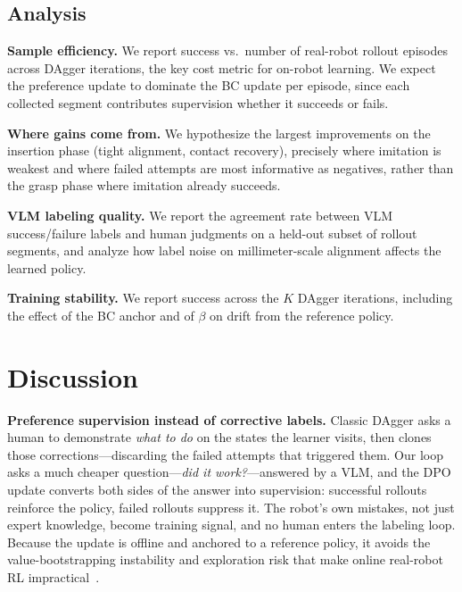 \documentclass[letterpaper, 10pt, conference]{ieeeconf}
\begin{document}
\subsection{Analysis}
\label{subsec:analysis}

\textbf{Sample efficiency.} We report success vs.\ number of real-robot rollout episodes across DAgger iterations, the key cost metric for on-robot learning. We expect the preference update to dominate the BC update per episode, since each collected segment contributes supervision whether it succeeds or fails.

\textbf{Where gains come from.} We hypothesize the largest improvements on the insertion phase (tight alignment, contact recovery), precisely where imitation is weakest and where failed attempts are most informative as negatives, rather than the grasp phase where imitation already succeeds.

\textbf{VLM labeling quality.} We report the agreement rate between VLM success/failure labels and human judgments on a held-out subset of rollout segments, and analyze how label noise on millimeter-scale alignment affects the learned policy.

\textbf{Training stability.} We report success across the $K$ DAgger iterations, including the effect of the BC anchor and of $\beta$ on drift from the reference policy.

\section{Discussion}
\label{sec:discussion}

\textbf{Preference supervision instead of corrective labels.} Classic DAgger asks a human to demonstrate \emph{what to do} on the states the learner visits, then clones those corrections---discarding the failed attempts that triggered them. Our loop asks a much cheaper question---\emph{did it work?}---answered by a VLM, and the DPO update converts both sides of the answer into supervision: successful rollouts reinforce the policy, failed rollouts suppress it. The robot's own mistakes, not just expert knowledge, become training signal, and no human enters the labeling loop. Because the update is offline and anchored to a reference policy, it avoids the value-bootstrapping instability and exploration risk that make online real-robot RL impractical~\cite{ibarz2021how,kalashnikov2018qtopt}.
\end{document}

